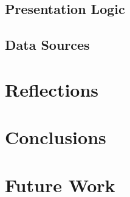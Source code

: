 \documentclass{article}
\begin{document}
\subsection{Presentation Logic}
\subsection{Data Sources}
\section{Reflections}
\section{Conclusions}

\section{Future Work}



\end{document}
